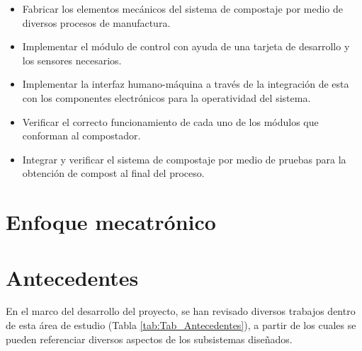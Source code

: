 \begin{itemize}
    \item Fabricar los elementos mecánicos del sistema de compostaje por medio de diversos procesos de manufactura.
    \item Implementar el módulo de control con ayuda de una tarjeta de desarrollo y los sensores necesarios.
    \item Implementar la interfaz humano-máquina a través de la integración de esta con los componentes electrónicos para la operatividad del sistema.
    \item Verificar el correcto funcionamiento de cada uno de los módulos que conforman al compostador.
    \item Integrar y verificar el sistema de compostaje por medio de pruebas para la obtención de compost al final del proceso. 

\end{itemize}

\section{Enfoque mecatrónico}



\section{Antecedentes}
En el marco del desarrollo del proyecto, se han revisado diversos trabajos dentro de esta área de estudio (Tabla \ref{tab:Tab_Antecedentes}), a partir de los cuales se pueden referenciar diversos aspectos  de los subsistemas diseñados.

